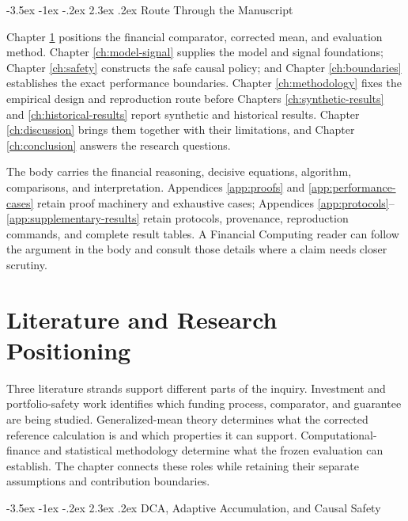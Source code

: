 \documentclass[12pt,a4paper,oneside]{report}
\makeatletter
\renewcommand\section{\@startsection{section}{1}{\z@}%
  {-3.5ex \@plus -1ex \@minus -.2ex}%
  {2.3ex \@plus .2ex}%
  {\normalfont\fontsize{14}{17}\selectfont\bfseries}}
\makeatother
\begin{document}
\section{Route Through the Manuscript}
\label{sec:introduction-navigation}

Chapter \ref{ch:literature} positions the financial comparator, corrected mean,
and evaluation method. Chapter \ref{ch:model-signal} supplies the model and
signal foundations; Chapter \ref{ch:safety} constructs the safe causal policy;
and Chapter \ref{ch:boundaries} establishes the exact performance boundaries.
Chapter \ref{ch:methodology} fixes the empirical design and reproduction route
before Chapters \ref{ch:synthetic-results} and \ref{ch:historical-results}
report synthetic and historical results. Chapter \ref{ch:discussion} brings
them together with their limitations, and Chapter \ref{ch:conclusion} answers
the research questions.

The body carries the financial reasoning, decisive equations, algorithm,
comparisons, and interpretation. Appendices \ref{app:proofs} and
\ref{app:performance-cases} retain proof machinery and exhaustive cases;
Appendices \ref{app:protocols}--\ref{app:supplementary-results} retain protocols,
provenance, reproduction commands, and complete result tables. A Financial
Computing reader can follow the argument in the body and consult those details
where a claim needs closer scrutiny.

\chapter{Literature and Research Positioning}
\label{ch:literature}
Three literature strands support different parts of the inquiry. Investment
and portfolio-safety work identifies which funding process, comparator, and
guarantee are being studied. Generalized-mean theory determines what the
corrected reference calculation is and which properties it can support.
Computational-finance and statistical methodology determine what the frozen
evaluation can establish. The chapter connects these roles while retaining
their separate assumptions and contribution boundaries.

\section{DCA, Adaptive Accumulation, and Causal Safety}
\end{document}
